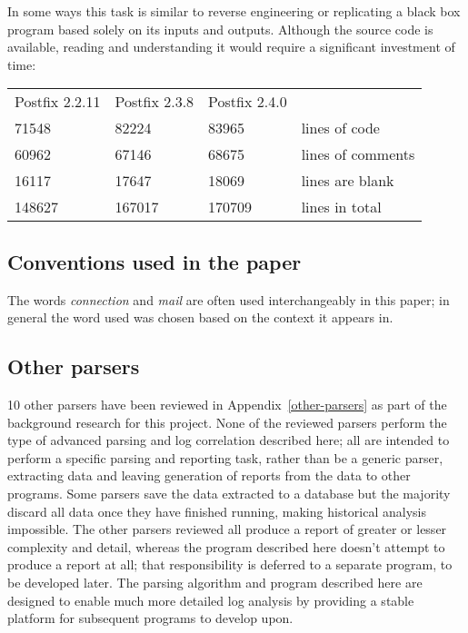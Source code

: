 \documentclass[a4paper,12pt,draft]{article}
\begin{document}
In some ways this task is similar to reverse engineering or replicating a
black box program based solely on its inputs and outputs.  Although the
source code is available, reading and understanding it would require a
significant investment of time:

\begin{tabular}[]{llll}

    Postfix 2.2.11  & Postfix 2.3.8   & Postfix 2.4.0 &                   \\
    71548           & 82224           & 83965         & lines of code     \\
    60962           & 67146           & 68675         & lines of comments \\
    16117           & 17647           & 18069         & lines are blank   \\
    148627          & 167017          & 170709        & lines in total    \\

\end{tabular}


\subsection{Conventions used in the paper}

The words \textit{connection\/} and \textit{mail\/} are often used
interchangeably in this paper; in general the word used was chosen based on
the context it appears in.

\subsection{Other parsers}

10 other parsers have been reviewed in Appendix~\ref{other-parsers} as part
of the background research for this project.  None of the reviewed parsers
perform the type of advanced parsing and log correlation described here;
all are intended to perform a specific parsing and reporting task, rather
than be a generic parser, extracting data and leaving generation of reports
from the data to other programs.  Some parsers save the data extracted to a
database but the majority discard all data once they have finished running,
making historical analysis impossible.  The other parsers reviewed all
produce a report of greater or lesser complexity and detail, whereas the
program described here doesn't attempt to produce a report at all; that
responsibility is deferred to a separate program, to be developed later.
The parsing algorithm and program described here are designed to enable
much more detailed log analysis by providing a stable platform for
subsequent programs to develop upon.
\end{document}
